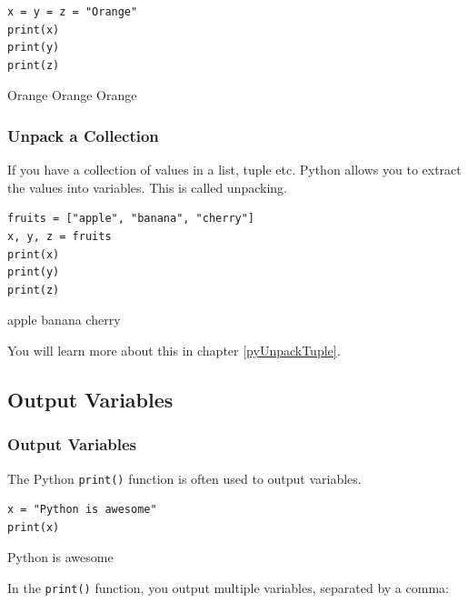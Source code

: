 \documentclass[12pt,a4paper]{article}
\newcommand{\code}[1]{%
	\colorbox{backcolour}{\lstinline{#1}}%
}
\begin{document}
\begin{ebox}
	\begin{lstlisting}
x = y = z = "Orange"
print(x)
print(y)
print(z)
	\end{lstlisting}
\tcblower
	\begin{vercode}
Orange
Orange
Orange
	\end{vercode}
\end{ebox}
\subsubsection{Unpack a Collection}

If you have a collection of values in a list, tuple etc. Python allows you to
extract the values into variables. This is called unpacking.

\begin{ebox}
	\begin{lstlisting}
fruits = ["apple", "banana", "cherry"]
x, y, z = fruits
print(x)
print(y)
print(z)
	\end{lstlisting}
\tcblower
	\begin{vercode}
apple
banana
cherry
	\end{vercode}
\end{ebox}

You will learn more about this in chapter \ref{pyUnpackTuple}.

\subsection{Output Variables}

\subsubsection{Output Variables}

The Python \code{print()} function is often used to output variables.

\begin{ebox}
	\begin{lstlisting}
x = "Python is awesome"
print(x)
	\end{lstlisting}
\tcblower
	\begin{vercode}
Python is awesome
	\end{vercode}
\end{ebox}

In the \code{print()} function, you output multiple variables, separated by a comma:
\end{document}
